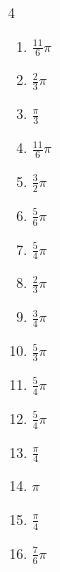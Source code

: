 \begin{multicols}{4}
\begin{enumerate}
  \item $\displaystyle \frac{11}{6}\pi$

  \item $\displaystyle \frac{2}{3}\pi$

  \item $\displaystyle \frac{\pi}{3}$

  \item $\displaystyle \frac{11}{6}\pi$

  \item $\displaystyle \frac{3}{2}\pi$

  \item $\displaystyle \frac{5}{6}\pi$

  \item $\displaystyle \frac{5}{4}\pi$

  \item $\displaystyle \frac{2}{3}\pi$

  \item $\displaystyle \frac{3}{4}\pi$

  \item $\displaystyle \frac{5}{3}\pi$

  \item $\displaystyle \frac{5}{4}\pi$

  \item $\displaystyle \frac{5}{4}\pi$

  \item $\displaystyle \frac{\pi}{4}$

  \item $\displaystyle \pi$

  \item $\displaystyle \frac{\pi}{4}$

\columnbreak %

  \item $\displaystyle \frac{7}{6}\pi$


\end{enumerate}
\end{multicols}
